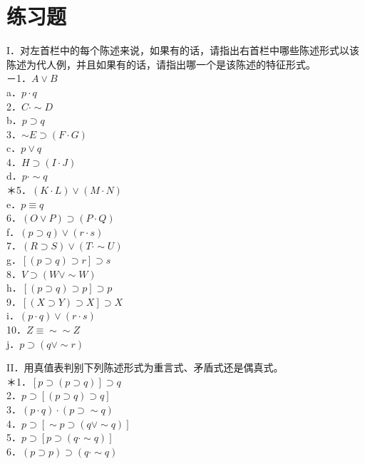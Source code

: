 \section*{练习题}
I．对左首栏中的每个陈述来说，如果有的话，请指出右首栏中哪些陈述形式以该陈述为代人例，并且如果有的话，请指出哪一个是该陈述的特征形式。\\
－1．$A \vee B$\\
a．$p \cdot q$\\
2．$C \cdot \sim D$\\
b．$p \supset q$\\
3．$\sim E \supset(F \cdot G)$\\
c．$p \vee q$\\
4．$H \supset(I \cdot J)$\\
d．$p \cdot \sim q$\\
＊5．$(K \cdot L) \vee(M \cdot N)$\\
e．$p \equiv q$\\
6．$(O \vee P) \supset(P \cdot Q)$\\
f．$(p \supset q) \vee(r \cdot s)$\\
7．$(R \supset S) \vee(T \cdot \sim U)$\\
g．$[(p \supset q) \supset r] \supset s$\\
8．$V \supset(W \vee \sim W)$\\
h．$[(p \supset q) \supset p] \supset p$\\
9．$[(X \supset Y) \supset X] \supset X$\\
i．$(p \cdot q) \vee(r \cdot s)$\\
10．$Z \equiv \sim \sim Z$\\
j．$p \supset(q \vee \sim r)$

II．用真值表判别下列陈述形式为重言式、矛盾式还是偶真式。\\
＊1．$[p \supset(p \supset q)] \supset q$\\
2．$p \supset[(p \supset q) \supset q]$\\
3．$(p \cdot q) \cdot(p \supset \sim q)$\\
4．$p \supset[\sim p \supset(q \vee \sim q)]$\\
5．$p \supset[p \supset(q \cdot \sim q)]$\\
6．$(p \supset p) \supset(q \cdot \sim q)$


